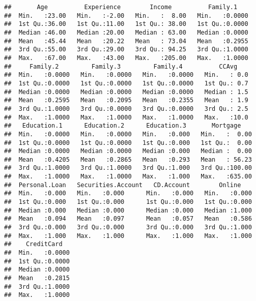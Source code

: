 \documentclass[
]{article}
\begin{document}
\begin{verbatim}
##       Age          Experience        Income          Family.1     
##  Min.   :23.00   Min.   :-2.00   Min.   :  8.00   Min.   :0.0000  
##  1st Qu.:36.00   1st Qu.:11.00   1st Qu.: 38.00   1st Qu.:0.0000  
##  Median :46.00   Median :20.00   Median : 63.00   Median :0.0000  
##  Mean   :45.44   Mean   :20.22   Mean   : 73.04   Mean   :0.2955  
##  3rd Qu.:55.00   3rd Qu.:29.00   3rd Qu.: 94.25   3rd Qu.:1.0000  
##  Max.   :67.00   Max.   :43.00   Max.   :205.00   Max.   :1.0000  
##     Family.2         Family.3         Family.4          CCAvg     
##  Min.   :0.0000   Min.   :0.0000   Min.   :0.0000   Min.   : 0.0  
##  1st Qu.:0.0000   1st Qu.:0.0000   1st Qu.:0.0000   1st Qu.: 0.7  
##  Median :0.0000   Median :0.0000   Median :0.0000   Median : 1.5  
##  Mean   :0.2595   Mean   :0.2095   Mean   :0.2355   Mean   : 1.9  
##  3rd Qu.:1.0000   3rd Qu.:0.0000   3rd Qu.:0.0000   3rd Qu.: 2.5  
##  Max.   :1.0000   Max.   :1.0000   Max.   :1.0000   Max.   :10.0  
##   Education.1      Education.2      Education.3       Mortgage     
##  Min.   :0.0000   Min.   :0.0000   Min.   :0.000   Min.   :  0.00  
##  1st Qu.:0.0000   1st Qu.:0.0000   1st Qu.:0.000   1st Qu.:  0.00  
##  Median :0.0000   Median :0.0000   Median :0.000   Median :  0.00  
##  Mean   :0.4205   Mean   :0.2865   Mean   :0.293   Mean   : 56.23  
##  3rd Qu.:1.0000   3rd Qu.:1.0000   3rd Qu.:1.000   3rd Qu.:100.00  
##  Max.   :1.0000   Max.   :1.0000   Max.   :1.000   Max.   :635.00  
##  Personal.Loan   Securities.Account   CD.Account        Online     
##  Min.   :0.000   Min.   :0.000      Min.   :0.000   Min.   :0.000  
##  1st Qu.:0.000   1st Qu.:0.000      1st Qu.:0.000   1st Qu.:0.000  
##  Median :0.000   Median :0.000      Median :0.000   Median :1.000  
##  Mean   :0.094   Mean   :0.097      Mean   :0.057   Mean   :0.586  
##  3rd Qu.:0.000   3rd Qu.:0.000      3rd Qu.:0.000   3rd Qu.:1.000  
##  Max.   :1.000   Max.   :1.000      Max.   :1.000   Max.   :1.000  
##    CreditCard    
##  Min.   :0.0000  
##  1st Qu.:0.0000  
##  Median :0.0000  
##  Mean   :0.2815  
##  3rd Qu.:1.0000  
##  Max.   :1.0000
\end{verbatim}
\end{document}
